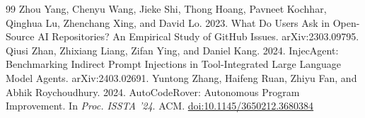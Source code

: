 \documentclass[acmsmall,screen,nonacm]{acmart}
\providecommand{\doi}[1]{\href{https://doi.org/#1}{doi:#1}}
\begin{document}
\begin{thebibliography}{99}
 Zhou Yang, Chenyu Wang, Jieke Shi, Thong Hoang, Pavneet Kochhar, Qinghua Lu, Zhenchang Xing, and David Lo. 2023. What Do Users Ask in Open-Source AI Repositories? An Empirical Study of GitHub Issues. arXiv:2303.09795.
 Qiusi Zhan, Zhixiang Liang, Zifan Ying, and Daniel Kang. 2024. InjecAgent: Benchmarking Indirect Prompt Injections in Tool-Integrated Large Language Model Agents. arXiv:2403.02691.
 Yuntong Zhang, Haifeng Ruan, Zhiyu Fan, and Abhik Roychoudhury. 2024. AutoCodeRover: Autonomous Program Improvement. In \emph{Proc. ISSTA '24}. ACM. \doi{10.1145/3650212.3680384}
\end{thebibliography}
\endgroup


\end{document}
